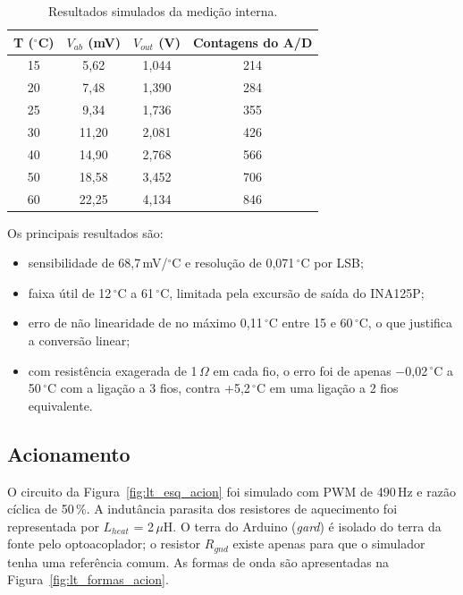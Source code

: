 \begin{table}[H]
\centering
\small
\renewcommand{\arraystretch}{1.2}
\caption{Resultados simulados da medição interna.}
\label{tab:sim_pt100}
\begin{tabular}{cccc}
\toprule
\textbf{T (\ensuremath{^\circ}C)} & \textbf{$V_{ab}$ (mV)} & \textbf{$V_{out}$ (V)} & \textbf{Contagens do A/D} \\
\midrule
15 & 5,62  & 1,044 & 214 \\
20 & 7,48  & 1,390 & 284 \\
25 & 9,34  & 1,736 & 355 \\
30 & 11,20 & 2,081 & 426 \\
40 & 14,90 & 2,768 & 566 \\
50 & 18,58 & 3,452 & 706 \\
60 & 22,25 & 4,134 & 846 \\
\bottomrule
\end{tabular}
\end{table}

Os principais resultados são:
\begin{itemize}
  \item sensibilidade de 68,7\,mV/\ensuremath{^\circ}C e resolução de 0,071\,\ensuremath{^\circ}C por LSB;
  \item faixa útil de 12\,\ensuremath{^\circ}C a 61\,\ensuremath{^\circ}C, limitada pela excursão de saída do INA125P;
  \item erro de não linearidade de no máximo 0,11\,\ensuremath{^\circ}C entre 15 e 60\,\ensuremath{^\circ}C, o que justifica a conversão linear;
  \item com resistência exagerada de 1\,$\Omega$ em cada fio, o erro foi de apenas $-$0,02\,\ensuremath{^\circ}C a 50\,\ensuremath{^\circ}C com a ligação a 3 fios, contra +5,2\,\ensuremath{^\circ}C em uma ligação a 2 fios equivalente.
\end{itemize}

\subsection{Acionamento}

O circuito da Figura~\ref{fig:lt_esq_acion} foi simulado com PWM de 490\,Hz e razão cíclica de 50\,\%. A indutância parasita dos resistores de aquecimento foi representada por $L_{heat}$ = 2\,$\mu$H. O terra do Arduino (\textit{gard}) é isolado do terra da fonte pelo optoacoplador; o resistor $R_{gnd}$ existe apenas para que o simulador tenha uma referência comum. As formas de onda são apresentadas na Figura~\ref{fig:lt_formas_acion}.

